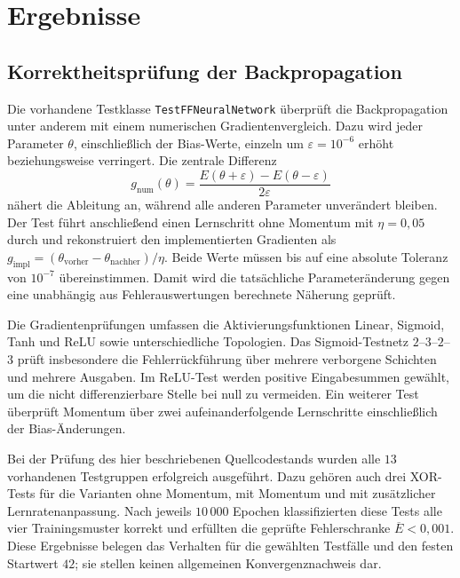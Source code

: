 \section{Ergebnisse}
\label{sec:ergebnisse}

\subsection{Korrektheitsprüfung der Backpropagation}
\label{sec:backpropagation-pruefung}

Die vorhandene Testklasse \texttt{TestFFNeuralNetwork} überprüft die
Backpropagation unter anderem mit einem numerischen Gradientenvergleich.
Dazu wird jeder Parameter $\theta$, einschließlich der Bias-Werte, einzeln
um $\varepsilon=10^{-6}$ erhöht beziehungsweise verringert. Die zentrale
Differenz
\begin{equation}
	g_{\mathrm{num}}(\theta)
	= \frac{E(\theta+\varepsilon)-E(\theta-\varepsilon)}
	{2\varepsilon}
	\label{eq:bp-gradient-check}
\end{equation}
nähert die Ableitung an, während alle anderen Parameter unverändert
bleiben. Der Test führt anschließend einen Lernschritt ohne Momentum mit
$\eta=0{,}05$ durch und rekonstruiert den implementierten Gradienten als
$g_{\mathrm{impl}}=(\theta_{\mathrm{vorher}}-
	\theta_{\mathrm{nachher}})/\eta$. Beide Werte müssen bis auf eine absolute
Toleranz von $10^{-7}$ übereinstimmen. Damit wird die tatsächliche
Parameteränderung gegen eine unabhängig aus Fehlerauswertungen berechnete
Näherung geprüft.

Die Gradientenprüfungen umfassen die Aktivierungsfunktionen Linear,
Sigmoid, Tanh und ReLU sowie unterschiedliche Topologien. Das
Sigmoid-Testnetz $2$--$3$--$2$--$3$ prüft insbesondere die Fehlerrückführung
über mehrere verborgene Schichten und mehrere Ausgaben. Im ReLU-Test
werden positive Eingabesummen gewählt, um die nicht differenzierbare
Stelle bei null zu vermeiden. Ein weiterer Test überprüft Momentum über
zwei aufeinanderfolgende Lernschritte einschließlich der Bias-Änderungen.

Bei der Prüfung des hier beschriebenen Quellcodestands wurden alle $13$
vorhandenen Testgruppen erfolgreich ausgeführt. Dazu gehören auch drei
XOR-Tests für die Varianten ohne Momentum, mit Momentum und mit zusätzlicher
Lernratenanpassung. Nach jeweils $10\,000$ Epochen klassifizierten diese
Tests alle vier Trainingsmuster korrekt und erfüllten die geprüfte
Fehlerschranke $\overline{E}<0{,}001$. Diese Ergebnisse belegen das
Verhalten für die gewählten Testfälle und den festen Startwert $42$; sie
stellen keinen allgemeinen Konvergenznachweis dar.

